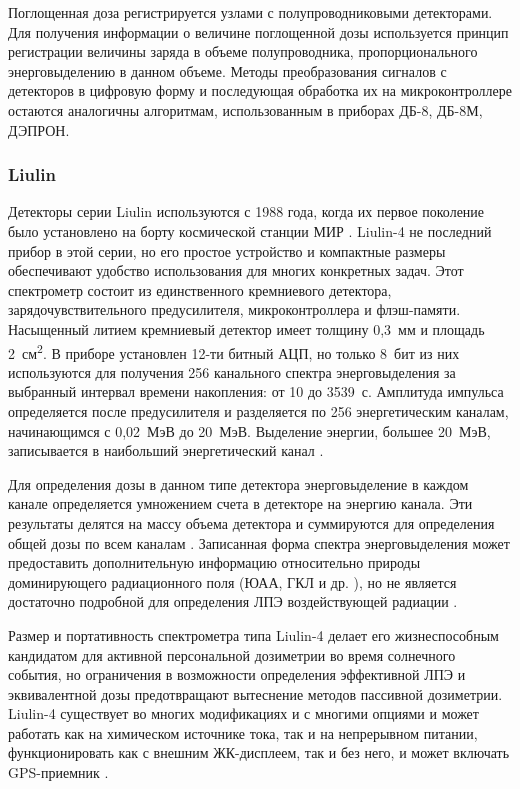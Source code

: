 Поглощенная доза регистрируется узлами с полупроводниковыми детекторами. Для получения информации о величине поглощенной дозы используется принцип регистрации величины заряда в объеме полупроводника, пропорционального энерговыделению в данном объеме. Методы преобразования сигналов с детекторов в цифровую форму и последующая обработка их на микроконтроллере остаются аналогичны алгоритмам, использованным в приборах ДБ-8, ДБ-8М, ДЭПРОН.  


\subsubsection{Liulin}

Детекторы серии Liulin используются с 1988 года, когда их первое поколение было установлено на борту космической станции МИР \cite{Caffrey2011}. Liulin-4 не последний прибор в этой серии, но его простое устройство и компактные размеры обеспечивают удобство использования для многих конкретных задач. Этот спектрометр состоит из единственного кремниевого детектора, зарядочувствительного предусилителя, микроконтроллера и флэш-памяти. Насыщенный литием кремниевый детектор имеет толщину 0,3~мм и площадь 2~см\textsuperscript{2}. В приборе установлен 12-ти битный АЦП, но только 8~бит из них используются для получения 256 канального спектра энерговыделения за выбранный интервал времени накопления: от 10 до 3539~с. Амплитуда импульса определяется после предусилителя и разделяется по 256 энергетическим каналам, начинающимся с 0,02~МэВ до 20~МэВ. Выделение энергии, большее 20~МэВ, записывается в наибольший энергетический канал \cite{Dachev2002} .


Для определения дозы в данном типе детектора энерговыделение в каждом канале определяется умножением счета в детекторе на энергию канала. Эти результаты делятся на массу объема детектора и суммируются для определения общей дозы по всем каналам \cite{Dachev2002} \cite{Luszik-Bhadra2010}. Записанная форма спектра энерговыделения может предоставить дополнительную информацию относительно природы доминирующего радиационного поля (ЮАА, ГКЛ и др. ), но не является достаточно подробной для определения ЛПЭ воздействующей радиации \cite{Caffrey2011}. 



Размер и портативность спектрометра типа Liulin-4 делает его жизнеспособным кандидатом для активной персональной дозиметрии во время солнечного события, но ограничения в возможности определения эффективной ЛПЭ и эквивалентной дозы предотвращают вытеснение методов пассивной дозиметрии. Liulin-4 существует во многих модификациях и с многими опциями и может работать как на химическом источнике тока, так и на непрерывном питании, функционировать как с внешним ЖК-дисплеем, так и без него, и может включать GPS-приемник \cite{Dachev2002}.	

